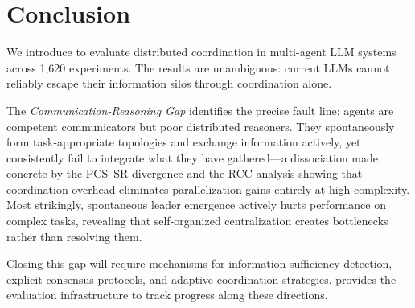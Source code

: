 \section{Conclusion}
\label{sec:conclusion}

We introduce \silobench{} to evaluate distributed coordination in multi-agent LLM systems across 1,620 experiments. 
The results are unambiguous: current LLMs cannot reliably escape their information silos through coordination alone.

The \textit{Communication-Reasoning Gap} identifies the precise fault line: agents are competent communicators but poor distributed reasoners. 
They spontaneously form task-appropriate topologies and exchange information actively, yet consistently fail to integrate what they have gathered---a dissociation made concrete by the PCS--SR divergence and the RCC analysis showing that coordination overhead eliminates parallelization gains entirely at high complexity. 
Most strikingly, spontaneous leader emergence actively hurts performance on complex tasks, revealing that self-organized centralization creates bottlenecks rather than resolving them.

Closing this gap will require mechanisms for information sufficiency detection, explicit consensus protocols, and adaptive coordination strategies. 
\silobench{} provides the evaluation infrastructure to track progress along these directions.
